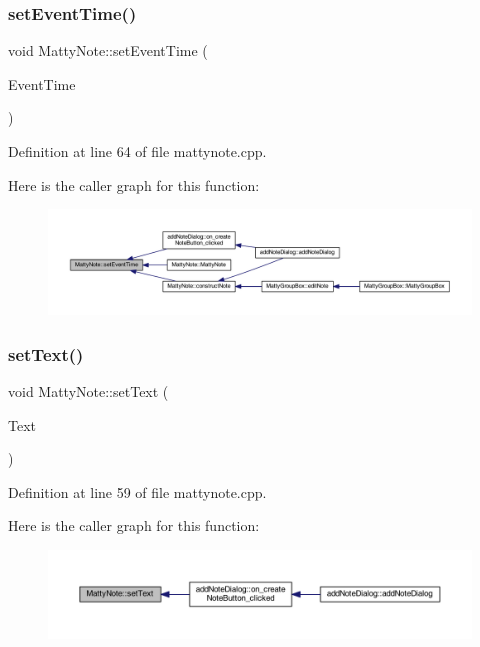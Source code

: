 \subsubsection{\texorpdfstring{set\+Event\+Time()}{setEventTime()}}
{\footnotesize\ttfamily void Matty\+Note\+::set\+Event\+Time (\begin{DoxyParamCaption}\item[{const Q\+String \&}]{Event\+Time }\end{DoxyParamCaption})}



Definition at line 64 of file mattynote.\+cpp.

Here is the caller graph for this function\+:
\nopagebreak
\begin{figure}[H]
\begin{center}
\leavevmode
\includegraphics[width=350pt]{classMattyNote_aaeba8670420ab9ad0fb8be660845e0ba_icgraph}
\end{center}
\end{figure}
\hypertarget{classMattyNote_afa0c4ee32401e4a09e8d04fd0b01da0b}{}\label{classMattyNote_afa0c4ee32401e4a09e8d04fd0b01da0b} 
\subsubsection{\texorpdfstring{set\+Text()}{setText()}}
{\footnotesize\ttfamily void Matty\+Note\+::set\+Text (\begin{DoxyParamCaption}\item[{const Q\+String \&}]{Text }\end{DoxyParamCaption})}



Definition at line 59 of file mattynote.\+cpp.

Here is the caller graph for this function\+:
\nopagebreak
\begin{figure}[H]
\begin{center}
\leavevmode
\includegraphics[width=350pt]{classMattyNote_afa0c4ee32401e4a09e8d04fd0b01da0b_icgraph}
\end{center}
\end{figure}
\hypertarget{classMattyNote_af7909f64608b020b501019cf29796eb0}{}\label{classMattyNote_af7909f64608b020b501019cf29796eb0} 

